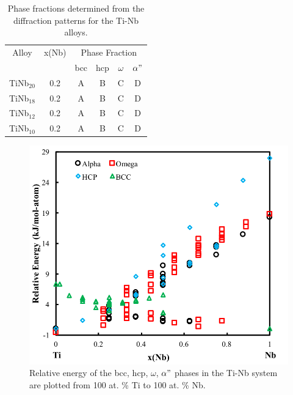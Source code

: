 \newpage
\begin{table}[H]
	\caption{Phase fractions determined from the diffraction patterns for the Ti-Nb alloys.}
	\centering
	\begin{tabular}{ c c c c c c }
		\hline
		Alloy & x(Nb) & \multicolumn{4}{c}{Phase Fraction} \\
		 &  & bcc & hcp & $\omega$ & $\alpha"$ \\
		\hline
		TiNb$_{20}$ & 0.2 & A & B & C & D \\
		TiNb$_{18}$ & 0.2 & A & B & C & D \\
		TiNb$_{12}$ & 0.2 & A & B & C & D \\
		TiNb$_{10}$ & 0.2 & A & B & C & D \\
		\hline
	\end{tabular}
	\label{Ch7-table:phasefrac}
\end{table}
\clearpage


\pagebreak
\begin{figure}[H]
	\centering
	\includegraphics[width=\textwidth]{Chapter-7/Figures/tinb0k.png}
	\caption{Relative energy of the bcc, hcp, $\omega$, $\alpha"$ phases in the Ti-Nb system are plotted from 100 at. \% Ti to 100 at. \% Nb.}
	\label{Ch7-figure:tinb0K}
\end{figure}

